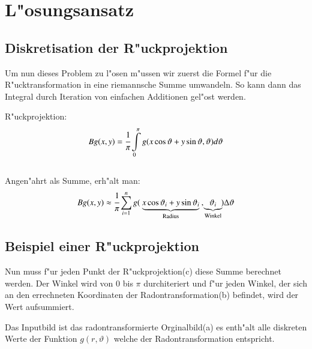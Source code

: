 \section{L"osungsansatz}

\subsection{Diskretisation der R"uckprojektion}

Um nun dieses Problem zu l"osen m"ussen wir zuerst die Formel f"ur die
R"ucktransformation in eine riemannsche Summe umwandeln. So kann dann
das Integral durch Iteration von einfachen Additionen gel"ost werden.

R"uckprojektion:
\begin{equation}
	Bg(x,y) = \cfrac{1}{\pi}\int\limits_0^\pi g(x\cos{\vartheta}+y\sin{\vartheta},\vartheta) d\vartheta
\end{equation}\\
Angen"ahrt als Summe, erh"alt man:
\begin{equation}
	Bg(x,y) \approx \cfrac{1}{\pi}\sum_{i=1}^{n} g(\:\underbrace{x\cos{\vartheta_i}+y\sin{\vartheta_i}}_{\text{Radius}}\:,\!\underbrace{\vartheta_i}_\text{{Winkel}}\!) \Delta\vartheta
\end{equation}

\subsection{Beispiel einer R"uckprojektion}

Nun muss f"ur jeden Punkt der R"uckprojektion(c) diese Summe berechnet
werden. Der Winkel wird von 0 bis $\pi$ durchiteriert und f"ur jeden
Winkel, der sich an den errechneten Koordinaten der Radontransformation(b)
befindet, wird der Wert aufsummiert.

Das Inputbild ist das radontransformierte Orginalbild(a) es enth"alt
alle diskreten Werte der Funktion $g(r,\vartheta)$ welche der
Radontransformation entspricht.

